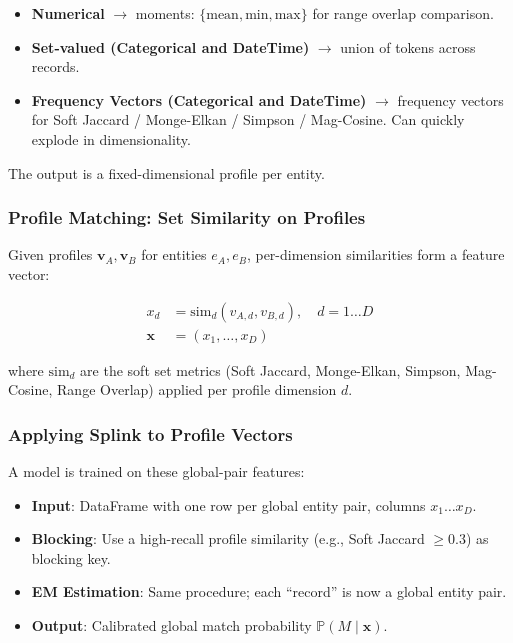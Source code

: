 \begin{itemize}
	\item \textbf{Numerical} $\to$ moments: $\{\text{mean}, \text{min}, \text{max}\}$ for range overlap comparison.
	\item \textbf{Set-valued (Categorical and DateTime)} $\to$ union of tokens across records.
	\item \textbf{Frequency Vectors (Categorical and DateTime)} $\to$ frequency vectors for Soft Jaccard / Monge-Elkan / Simpson / Mag-Cosine. Can quickly explode in dimensionality. \citep{winkler1989frequency}
\end{itemize}

The output is a fixed-dimensional profile per entity.

\subsubsection{Profile Matching: Set Similarity on Profiles}
\label{sec:profile_matching}

Given profiles $\mathbf{v}_A, \mathbf{v}_B$ for entities $e_A, e_B$, per-dimension similarities form a feature vector:

\begin{align}
	x_d        & = \text{sim}_d(v_{A,d}, v_{B,d}), \quad d = 1 \dots D \\
	\mathbf{x} & = (x_1, \dots, x_D)
\end{align}

where $\text{sim}_d$ are the soft set metrics (Soft Jaccard, Monge-Elkan, Simpson, Mag-Cosine, Range Overlap) applied per profile dimension $d$.

\subsubsection{Applying Splink to Profile Vectors}
\label{sec:profile_splink}

A \fellegisunter{} model is trained on these global-pair features:

\begin{itemize}
	\item \textbf{Input}: DataFrame with one row per global entity pair, columns $x_1 \dots x_D$.
	\item \textbf{Blocking}: Use a high-recall profile similarity (e.g., Soft Jaccard $\ge 0.3$) as blocking key.
	\item \textbf{EM Estimation}: Same procedure; each ``record'' is now a global entity pair.
	\item \textbf{Output}: Calibrated global match probability $\mathbb{P}(M \mid \mathbf{x})$.
\end{itemize}

